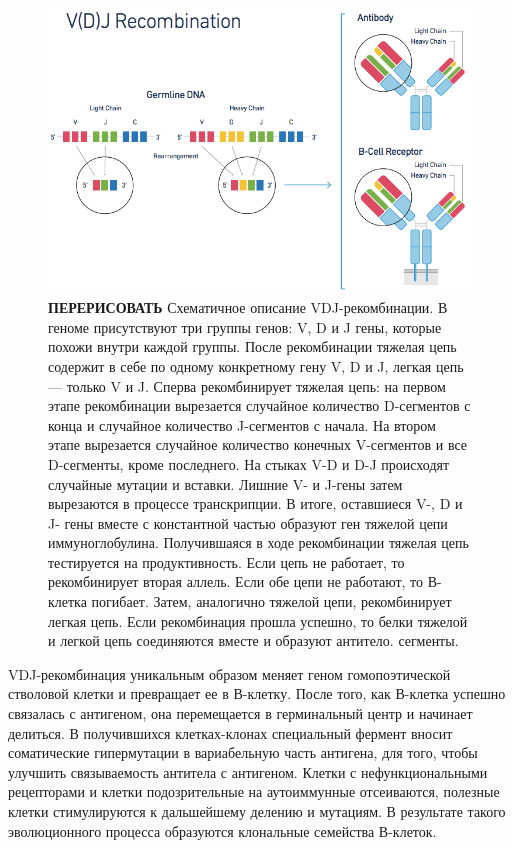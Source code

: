\documentclass{spbau-diploma}
\begin{document}
\begin{figure}[h!]
    \centering
    \includegraphics[width=.9\textwidth]{figures/10x_vdj_recombination.png}
    \caption{\textbf{ПЕРЕРИСОВАТЬ} Схематичное описание VDJ-рекомбинации. В геноме присутствуют три группы генов: V, D и J гены, которые похожи внутри каждой группы. После рекомбинации тяжелая цепь содержит в себе по одному конкретному гену V, D и J, легкая цепь --- только V и J. Сперва рекомбинирует тяжелая цепь: на первом этапе рекомбинации вырезается случайное количество D-сегментов с конца и случайное количество J-сегментов с начала. На втором этапе вырезается случайное количество конечных V-сегментов и все D-сегменты, кроме последнего. На стыках V-D и D-J происходят случайные мутации и вставки. Лишние V- и J-гены затем вырезаются в процессе транскрипции. В итоге, оставшиеся V-, D и J- гены вместе с константной частью образуют ген тяжелой цепи иммуноглобулина. Получившаяся в ходе рекомбинации тяжелая цепь тестируется на продуктивность. Если цепь не работает, то рекомбинирует вторая аллель. Если обе цепи не работают, то В-клетка погибает. Затем, аналогично тяжелой цепи, рекомбинирует легкая цепь. Если рекомбинация прошла успешно, то белки тяжелой и легкой цепь соединяются вместе и образуют антитело. 
сегменты. }
    \label{10x_vdj_recombination}
\end{figure}

VDJ-рекомбинация уникальным образом меняет геном гомопоэтической стволовой клетки и превращает ее в В-клетку. После того, как В-клетка успешно связалась с антигеном, она перемещается в герминальный центр и начинает делиться. В получившихся клетках-клонах специальный фермент вносит соматические гипермутации в вариабельную часть антигена, для того, чтобы улучшить связываемость антитела с антигеном. Клетки с нефункциональными рецепторами и клетки подозрительные на аутоиммунные отсеиваются, полезные клетки стимулируются к дальшейшему делению и мутациям. В результате такого эволюционного процесса образуются клональные семейства В-клеток. 
\end{document}
